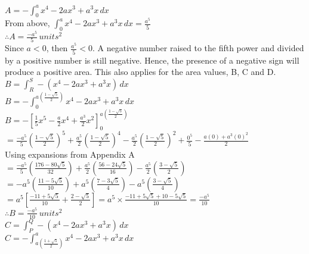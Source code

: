 \documentclass{homework}
\begin{document}
\begin{flushleft}
\begin{paracol}{2}
    $A=-\int_0^ax^4-2ax^3+a^3x\, dx$ \vspace{0.5em}\\
    From above, $\int_0^ax^4-2ax^3+a^3x\, dx=\frac{a^5}{5}$ \vspace{0.5em}\\
    $\therefore A=\frac{-a^5}{5} \, units^2$ \vspace{1.5em} \\
    Since $a<0$, then $\frac{a^5}{5}<0$. A negative number raised to the fifth power and divided by a positive number is still negative. Hence, the presence of a negative sign will produce a positive area. This also applies for the area values, B, C and D.
    \switchcolumn
    $B=\int_R^S-(x^4-2ax^3+a^3x)\, dx$ \vspace{0.5em} \\
    $B=-\int_0^{a(\frac{1-\sqrt{5}}{2})}x^4-2ax^3+a^3x\, dx$ \vspace{0.5em} \\
    $B=-[\frac{1}{5}x^5-\frac{a}{2}x^4+\frac{a^3}{2}x^2]_0^{a(\frac{1 - \sqrt{5}}{2})}$ \vspace{0.3em} \\
    $=\frac{-a^5}{5}(\frac{1 - \sqrt{5}}{2})^5+\frac{a^5}{2}(\frac{1 - \sqrt{5}}{2})^4-\frac{a^5}{2}(\frac{1 - \sqrt{5}}{2})^2+\frac{0^5}{5}-\frac{a(0)+a^3(0)^2}{2}$ \vspace{0.033em}\\
    Using expansions from Appendix A \vspace{0.3em} \\
    $=\frac{-a^5}{5}(\frac{176 - 80 \sqrt{5}}{32})+\frac{a^5}{2}(\frac{56 - 24\sqrt{5}}{16})-\frac{a^5}{2}(\frac{3 - \sqrt{5}}{2})$ \vspace{0.5em} \\
    $=-a^5(\frac{11 - 5 \sqrt{5}}{10})+a^5(\frac{7 - 3\sqrt{5}}{4})-a^5(\frac{3 - \sqrt{5}}{4})$ \vspace{0.5em} \\
    $=a^5[\frac{-11+5 \sqrt{5}}{10}+\frac{2-\sqrt{5}}{2}]=a^5\times\frac{-11+5\sqrt{5}+10-5\sqrt{5}}{10}=\frac{-a^5}{10}$ \vspace{0.4em} \\
    $\therefore B=\frac{-a^5}{10}\, units^2$ \vspace{0.2em} \\
    \switchcolumn
    \newpage
    $C=\int_P^Q -(x^4-2ax^3+a^3x)\, dx $ \vspace{0.5em} \\ 
    $C=-\int_{a(\frac{1+\sqrt{5}}{2})}^a x^4-2ax^3+a^3x\, dx $ \vspace{0.5em} \\

\end{paracol}
\end{flushleft}
\end{document}
